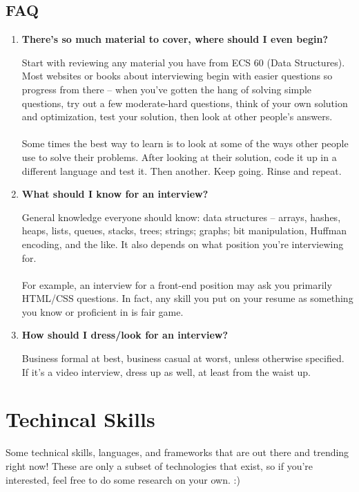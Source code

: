 \documentclass{article}
\begin{document}
\subsection{FAQ}
\begin{enumerate}
    \item \textbf{There's so much material to cover, where should I even begin?}
    \begin{itemize}
       Start with reviewing any material you have from ECS 60 (Data Structures). Most websites or books about interviewing begin with easier questions so progress from there -- when you've gotten the hang of solving simple questions, try out a few moderate-hard questions, think of your own solution and optimization, test your solution, then look at other people's answers.\\\\Some times the best way to learn is to look at some of the ways other people use to solve their problems. After looking at their solution, code it up in a different language and test it. Then another. Keep going. Rinse and repeat. 
    \end{itemize}
    \item \textbf{What should I know for an interview?}
    \begin{itemize}
       General knowledge everyone should know: data structures -- arrays, hashes, heaps, lists, queues, stacks, trees; strings; graphs; bit manipulation, Huffman encoding, and the like. It also depends on what position you're interviewing for. \\\\For example, an interview for a front-end position may ask you primarily HTML/CSS questions. In fact, any skill you put on your resume as something you know or proficient in is fair game. 
    \end{itemize}
    \item \textbf {How should I dress/look for an interview?}
    \begin{itemize}
        Business formal at best, business casual at worst, unless otherwise specified. If it's a video interview, dress up as well, at least from the waist up. 
    \end{itemize}
\end{enumerate}
\newpage
\newpage
\section {Techincal Skills}
\hspace{0.5cm}Some technical skills, languages, and frameworks that are out there and trending right now! These are only a subset of technologies that exist, so if you're interested, feel free to do some research on your own. :) 
\end{document}
